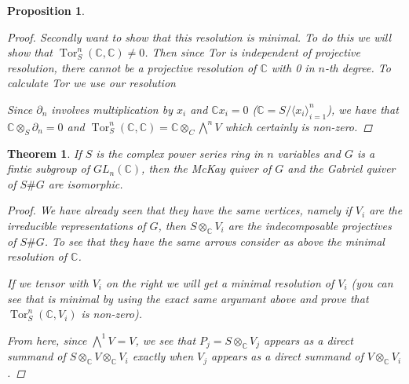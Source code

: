 \documentclass[11pt, a4paper, english]{article}
\newtheorem{prop}{Proposition}
\numberwithin{prop}{section}
\numberwithin{lemma}{section}
\newtheorem{theorem}{Theorem}
\numberwithin{theorem}{section}
\numberwithin{defin}{section}
\numberwithin{example}{section}
\newcommand{\C}{\mathbb{C}}
\DeclareMathOperator{\Tor}{Tor}
\begin{document}
\begin{prop}
\begin{proof}
Secondly want to show that this resolution is minimal. To do this we will show that $\Tor^n_S(\C, \C) \neq 0$. Then since Tor is independent of projective resolution, there cannot be a projective resolution of $\C$ with 0 in $n$-th degree. To calculate Tor we use our resolution
\begin{center}
\end{center}
Since $\partial_n$ involves multiplication by $x_i$ and $\C x_i = 0$ ($\C = S/\langle x_i \rangle_{i=1}^n$), we have that $\C \otimes_S \partial_n = 0$ and $\Tor^n_S(\C, \C) = \C \otimes_C \bigwedge\limits^n V $ which certainly is non-zero. 
\end{proof}
\end{prop}

\begin{theorem}
If $S$ is the complex power series ring in $n$ variables and $G$ is a fintie subgroup of $GL_n(\C)$, then the McKay quiver of $G$ and the Gabriel quiver of $S\#G$ are isomorphic.
\begin{proof}
We have already seen that they have the same vertices, namely if $V_i$ are the irreducible representations of $G$, then $S \otimes_\C V_i$ are the indecomposable projectives of $S\#G$. To see that they have the same arrows consider as above the minimal resolution of $\C$.
\begin{center}
\end{center}
If we tensor with $V_i$ on the right we will get a minimal resolution of $V_i$ (you can see that is minimal by using the exact same argumant above and prove that $\Tor^n_S(\C, V_i)$ is non-zero).
\begin{center}
\end{center}
From here, since $\bigwedge\limits^{1} V = V$, we see that $P_j = S \otimes_\C V_j$ appears as a direct summand of $S \otimes_\C V \otimes_\C V_i$ exactly when $V_j$ appears as a direct summand of $V \otimes_\C V_i$.
\end{proof}
\end{theorem}
\end{document}
